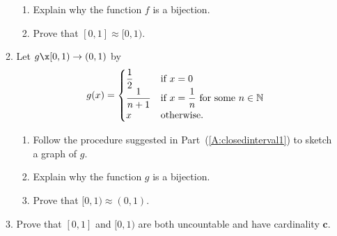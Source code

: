 \begin{enumerate}
\begin{enumerate}
\begin{enumerate}
\item Explain why the function $f$ is a bijection.
\item Prove that $[ 0, 1 ] \approx [ 0, 1 )$.
\end{enumerate}
%
\item Let $g\x  [ 0, 1 ) \to ( 0, 1 )$ by
\begin{equation} \notag
g ( x ) = 
\begin{cases}
\dfrac{1}{2}           &\text{if $x=0$} \\
\dfrac{1}{n+1}         &\text{if $x=\dfrac{1}{n}$ for some $n \in \mathbb{N}$} \\
x        &\text{otherwise}.
\end{cases}
\end{equation}
\begin{enumerate}
\item Follow the procedure suggested in Part~(\ref{A:closedinterval1}) to sketch a graph of $g$.
\item Explain why the function $g$ is a bijection.
\item Prove that $[ 0, 1 ) \approx ( 0, 1 )$.
\end{enumerate}

\item Prove that $[ 0, 1 ]$ and $[ 0, 1 )$ are both uncountable and have cardinality $\boldsymbol{c}$.
\end{enumerate}
\end{enumerate}

\hbreak
\endinput
